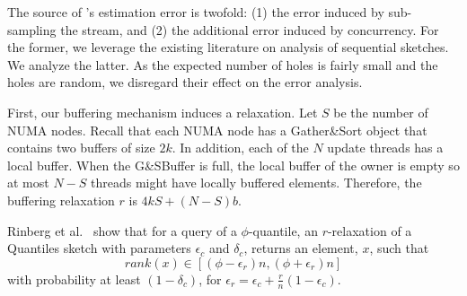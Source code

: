 The source of \mysketch's estimation error is twofold: (1) the error induced by sub-sampling the stream, and (2) the additional error induced by concurrency. For the former, we leverage the existing literature on analysis of sequential sketches. We analyze the latter. 
As the expected number of holes is fairly small and the holes are random, we disregard their effect on the error analysis. 

First, our buffering mechanism induces a relaxation. Let $S$ be the number of NUMA nodes. Recall that each NUMA node has a Gather\&Sort object that contains two buffers of size $2k$. In addition, each of the $N$ update threads has a local buffer. When the G\&SBuffer is full, the local buffer of the owner is empty so at most $N-S$ threads might have locally buffered elements. Therefore, the buffering relaxation $r$ is $4kS+(N-S)b$.


Rinberg et al.~\cite{Rinberg_2020_fast_sketches} show that for a query of a $\phi$-quantile, an $r$-relaxation of a Quantiles sketch with parameters $\epsilon_c$ and $\delta_c$, returns an element, $x$, such that
\[ rank(x) \in [(\phi-\epsilon_r)n,(\phi+\epsilon_r)n] \]
with probability at least $(1-\delta_c)$, for $\epsilon_r=\epsilon_c+\frac{r}{n}(1-\epsilon_c)$.

